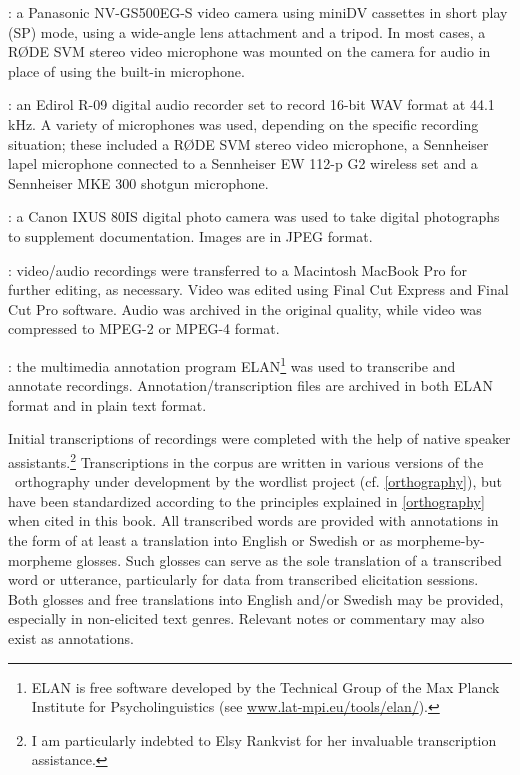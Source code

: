 : a Panasonic NV-GS500EG-S video camera using miniDV cassettes in short play (SP) mode, using a wide-angle lens attachment and a tripod. In most cases, a RØDE SVM stereo video microphone was mounted on the camera for audio in place of using the built-in microphone.

: an Edirol R-09 digital audio recorder set to record 16-bit WAV format at 44.1 kHz. A variety of microphones was used, depending on the specific recording situation; these included a RØDE SVM stereo video microphone, a Sennheiser lapel microphone connected to a Sennheiser EW 112-p G2 wireless set and a Sennheiser MKE 300 shotgun microphone. %

: a Canon IXUS 80IS digital photo camera was used to take digital photographs to supplement documentation. Images are in JPEG format.

: video/audio recordings were transferred to a Macintosh MacBook Pro for further editing, as necessary. Video was edited using Final Cut Express and Final Cut Pro software. Audio was archived in the original quality, while video was compressed to MPEG-2 or MPEG-4 format.

: the multimedia annotation program ELAN\footnote{ELAN is free software developed by the Technical Group of the Max Planck Institute for Psycholinguistics (see \href{http://www.lat-mpi.eu/tools/elan/}{www.lat-mpi.eu/tools/elan/}).} 
was used to transcribe and annotate recordings. Annotation/transcription files are archived in both ELAN format and in plain text format.


Initial transcriptions of recordings were completed with the help of native speaker assistants.\footnote{I am particularly indebted to Elsy Rankvist for her invaluable transcription assistance.} 
Transcriptions in the corpus are written in various versions of the \PS\ orthography under development by the wordlist project  (cf. \SEC\ref{orthography}),  %
but have been standardized according to the principles explained in \SEC\ref{orthography} when cited in this book. 
All transcribed words are provided with annotations in the form of at least a translation into English or Swedish or as morpheme-by-morpheme glosses. Such glosses can serve as the sole translation of a transcribed word or utterance, particularly for data from transcribed elicitation sessions. Both glosses and free translations into English and/or Swedish may be provided, especially in non-elicited text genres. Relevant notes or commentary may also exist as annotations. 

